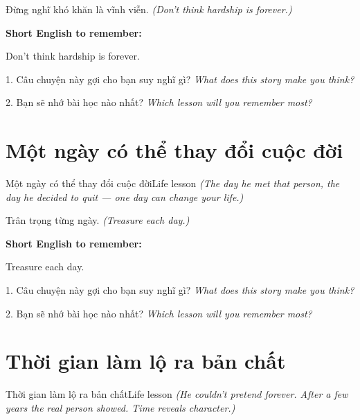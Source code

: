 \begin{baihoc}
Đừng nghĩ khó khăn là vĩnh viễn.
\textit{(Don't think hardship is forever.)}
\end{baihoc}

\begin{ghinhoanh}
\textbf{Short English to remember:}

Don't think hardship is forever.

\end{ghinhoanh}

\begin{tuhocnhanh}
1. Câu chuyện này gợi cho bạn suy nghĩ gì? \textit{What does this story make you think?}

2. Bạn sẽ nhớ bài học nào nhất? \textit{Which lesson will you remember most?}
\end{tuhocnhanh}
\ngancach


\section{Một ngày có thể thay đổi cuộc đời}
\begin{truyen}{Một ngày có thể thay đổi cuộc đời}{Life lesson}
\textit{(The day he met that person, the day he decided to quit — one day can change your life.)}
\end{truyen}

\begin{baihoc}
Trân trọng từng ngày.
\textit{(Treasure each day.)}
\end{baihoc}

\begin{ghinhoanh}
\textbf{Short English to remember:}

Treasure each day.

\end{ghinhoanh}

\begin{tuhocnhanh}
1. Câu chuyện này gợi cho bạn suy nghĩ gì? \textit{What does this story make you think?}

2. Bạn sẽ nhớ bài học nào nhất? \textit{Which lesson will you remember most?}
\end{tuhocnhanh}
\ngancach


\section{Thời gian làm lộ ra bản chất}
\begin{truyen}{Thời gian làm lộ ra bản chất}{Life lesson}
\textit{(He couldn't pretend forever. After a few years the real person showed. Time reveals character.)}
\end{truyen}

